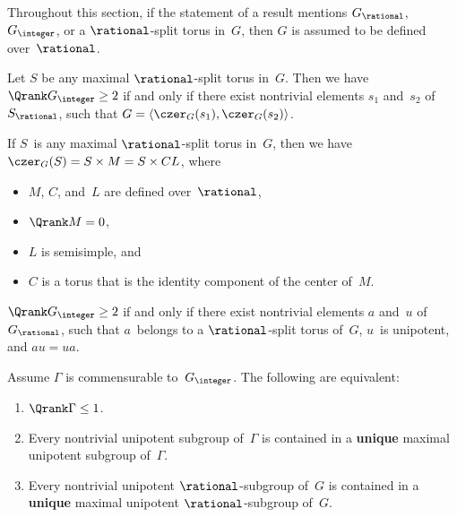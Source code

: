 \begin{assump}
Throughout this section, if the statement of a result mentions $G_\rational$, $G_\integer$, or a $\rational$-split torus in~$G$, then $G$ is assumed to be defined over~$\rational$.
\end{assump}

\begin{prop} \label{Qrank2<>C(a)gens}
Let $S$ be any maximal\/ $\rational$-split torus in~$G$. Then we have
 $\Qrank G_\integer \ge 2$
 if and only if there exist nontrivial elements $s_1$ and~$s_2$ of~$S_\rational$,
such that $G = \langle \czer_G(s_1), \czer_G(s_2)\rangle$.
\end{prop}


\begin{lem} \label{C(A)=AM}
If $S$~is any maximal $\rational$-split torus in~$G$, then we have $\czer_G(S) = S \times M = S \times CL$, where 
	\begin{itemize}
	\item $M$, $C$, and~$L$ are defined over~$\rational$,
	\item $\Qrank M = 0$,
	\item $L$ is semisimple,
	and
	\item $C$ is a torus that is the identity component of the center of~$M$.
	\end{itemize}
\end{lem}

 \begin{prop}[\csee{Qrank2<>au=uaEx}] \label{Qrank2<>au=ua}
 $\Qrank G_\integer \ge 2$ if and only if there exist nontrivial elements $a$ and~$u$ of~$G_\rational$, such that $a$~belongs to a\/ $\rational$-split torus of~$G$, $u$~is unipotent, and $au = ua$.
\end{prop}

\begin{lem} \label{Qrank1UniqMaxUnip}
Assume\/ $\Gamma$ is commensurable to~$G_\integer$. The following are equivalent:
	\begin{enumerate}
	\item $\Qrank \Gamma \le 1$.
	\item Every nontrivial unipotent subgroup of\/~$\Gamma$ is contained in a \textbf{unique} maximal unipotent subgroup of\/~$\Gamma$.
	\item Every nontrivial unipotent\/ $\rational$-subgroup of~$G$ is contained in a \textbf{unique} maximal unipotent\/ $\rational$-subgroup of~$G$.
	\end{enumerate}
\end{lem}


